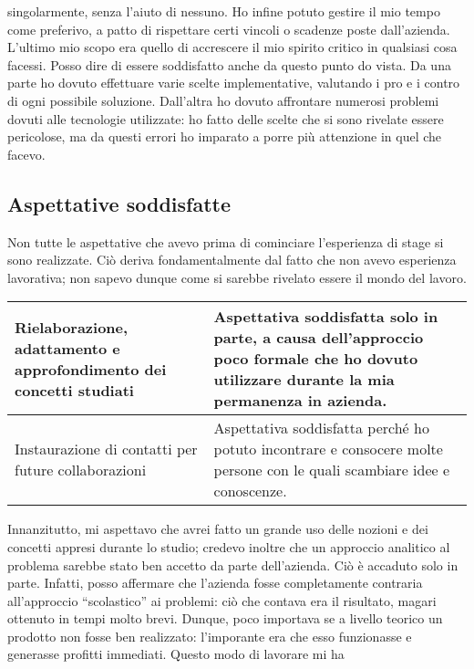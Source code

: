 			singolarmente, senza l'aiuto di nessuno. Ho infine potuto gestire il mio tempo come preferivo, a patto di rispettare certi
			vincoli o scadenze poste dall'azienda.\\
			L'ultimo mio scopo era quello di accrescere il mio spirito critico in qualsiasi cosa facessi. Posso dire di essere
			soddisfatto anche da questo punto do vista. Da una parte ho dovuto effettuare varie scelte implementative, valutando i pro e
			i contro di ogni possibile soluzione. Dall'altra ho dovuto affrontare numerosi problemi dovuti alle tecnologie utilizzate:
			ho fatto delle scelte che si sono rivelate essere pericolose, ma da questi errori ho imparato a porre più attenzione in quel
			che facevo.
		\subsection{Aspettative soddisfatte}
			Non tutte le aspettative che avevo prima di cominciare l'esperienza di stage si sono realizzate. Ciò deriva fondamentalmente
			dal fatto che non avevo esperienza lavorativa; non sapevo dunque come si sarebbe rivelato essere il mondo del lavoro.\\
			\begin{center}
				\begin{tabular}[H]{p{} | p{}}
					Rielaborazione, adattamento e approfondimento dei concetti studiati &
					Aspettativa soddisfatta solo in parte, a causa dell'approccio poco formale che ho dovuto utilizzare durante
					la mia permanenza in azienda.\\
					\hline
					Instaurazione di contatti per future collaborazioni &
					Aspettativa soddisfatta perché ho potuto incontrare e consocere molte persone con le quali scambiare idee e
					conoscenze.\\
				\end{tabular}
			\end{center}
			Innanzitutto, mi aspettavo che avrei fatto un grande uso delle nozioni e dei concetti appresi durante lo studio; credevo
			inoltre che un approccio analitico al problema sarebbe stato ben accetto da parte dell'azienda. Ciò è accaduto solo in parte.
			Infatti, posso affermare che l'azienda fosse completamente contraria all'approccio “scolastico” ai problemi: ciò
			che contava era il risultato, magari ottenuto in tempi molto brevi. Dunque, poco importava se a livello teorico un prodotto
			non fosse ben realizzato: l'imporante era che esso funzionasse e generasse profitti immediati. Questo modo di lavorare mi ha
